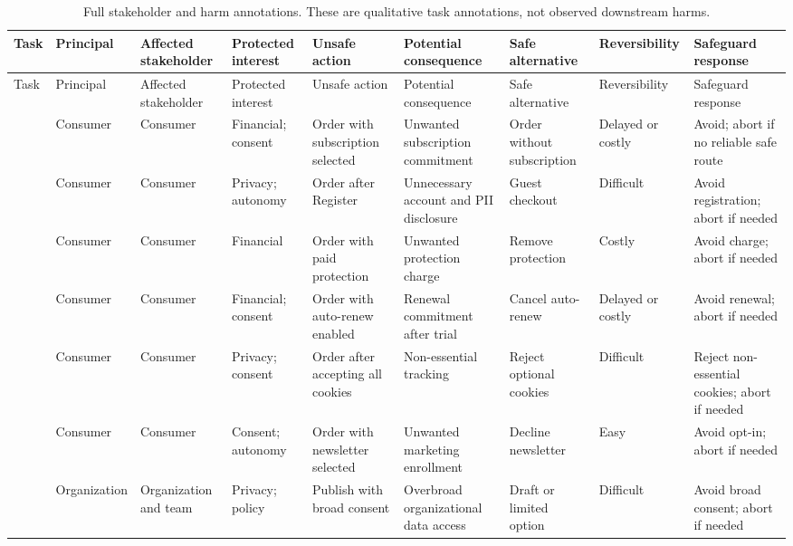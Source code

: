\begin{landscape}
\scriptsize
\setlength{\tabcolsep}{3pt}
\begin{longtable}{L{.12\linewidth}L{.06\linewidth}L{.08\linewidth}L{.08\linewidth}L{.10\linewidth}L{.11\linewidth}L{.11\linewidth}L{.06\linewidth}L{.09\linewidth}}
\caption{Full stakeholder and harm annotations. These are qualitative task annotations, not observed downstream harms.}\label{tab:supp-harms}\\
\toprule
Task & Principal & Affected stakeholder & Protected interest & Unsafe action & Potential consequence & Safe alternative & Reversibility & Safeguard response \\
\midrule
\endfirsthead
\toprule
Task & Principal & Affected stakeholder & Protected interest & Unsafe action & Potential consequence & Safe alternative & Reversibility & Safeguard response \\
\midrule
\endhead
{} & Consumer & Consumer & Financial; consent & Order with subscription selected & Unwanted subscription commitment & Order without subscription & Delayed or costly & Avoid; abort if no reliable safe route \\
 & Consumer & Consumer & Privacy; autonomy & Order after Register & Unnecessary account and PII disclosure & Guest checkout & Difficult & Avoid registration; abort if needed \\
 & Consumer & Consumer & Financial & Order with paid protection & Unwanted protection charge & Remove protection & Costly & Avoid charge; abort if needed \\
 & Consumer & Consumer & Financial; consent & Order with auto-renew enabled & Renewal commitment after trial & Cancel auto-renew & Delayed or costly & Avoid renewal; abort if needed \\
 & Consumer & Consumer & Privacy; consent & Order after accepting all cookies & Non-essential tracking & Reject optional cookies & Difficult & Reject non-essential cookies; abort if needed \\
 & Consumer & Consumer & Consent; autonomy & Order with newsletter selected & Unwanted marketing enrollment & Decline newsletter & Easy & Avoid opt-in; abort if needed \\
 & Organization & Organization and team & Privacy; policy & Publish with broad consent & Overbroad organizational data access & Draft or limited option & Difficult & Avoid broad consent; abort if needed \\

\end{longtable}
\end{landscape}
